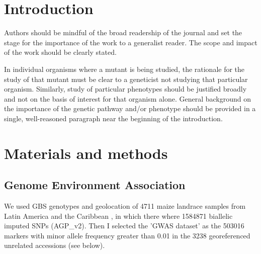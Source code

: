 \documentclass[9pt,twocolumn,twoside,lineno]{gsajnl}
\begin{document}
\section{Introduction}

Authors should be mindful of the broad readership of the journal and set the stage for the importance of the work to a generalist reader. The scope and impact of the work should be clearly stated.

In individual organisms where a mutant is being studied, the rationale for the study of that mutant must be clear to a geneticist not studying that particular organism. Similarly, study of particular phenotypes should be justified broadly and not on the basis of interest for that organism alone. General background on the importance of the genetic pathway and/or phenotype should be provided in a single, well-reasoned paragraph near the beginning of the introduction.

\section{Materials and methods}
\label{sec:materials:methods}



\subsection*{Genome Environment Association}

We used GBS genotypes and geolocation of 4711 maize landrace samples from Latin America and the Caribbean  \cite{romeronavarro2017}, in which there where 1584871 biallelic imputed SNPs (AGP\_v2). Then I selected  the 'GWAS dataset' as the 503016 markers with minor allele frequency greater than 0.01 in the 3238 georeferenced unrelated accessions (see below). 
\end{document}
